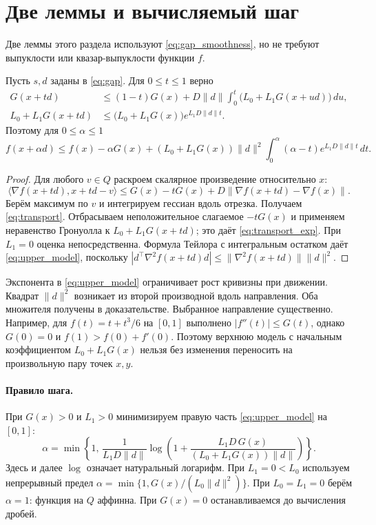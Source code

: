 \section{Две леммы и вычисляемый шаг}
Две леммы этого раздела используют \eqref{eq:gap_smoothness},
но не требуют выпуклости или квазар-выпуклости функции $f$.

\begin{lemma}\label{lem:transport}
Пусть $s,d$ заданы в \eqref{eq:gap}. Для $0\le t\le1$ верно
\begin{align}
 G(x+td)&\le(1-t)G(x)
    +D\|d\|\int_0^t\bigl(L_0+L_1G(x+ud)\bigr)\,du,
       \label{eq:transport}\\
 L_0+L_1G(x+td)&\le
      \bigl(L_0+L_1G(x)\bigr)e^{L_1D\|d\|t}.
       \label{eq:transport_exp}
\end{align}
Поэтому для $0\le\alpha\le1$
\begin{equation}\label{eq:upper_model}
 f(x+\alpha d)\le f(x)-\alpha G(x)
 +(L_0+L_1G(x))\|d\|^2
       \int_0^\alpha(\alpha-t)e^{L_1D\|d\|t}\,dt.
\end{equation}
\end{lemma}
\begin{proof}
Для любого $v\in Q$ раскроем скалярное произведение относительно $x$:
\[
 \langle\nabla f(x+td),x+td-v\rangle
 \le G(x)-tG(x)
       +D\|\nabla f(x+td)-\nabla f(x)\|.
\]
Берём максимум по $v$ и интегрируем гессиан вдоль отрезка.
Получаем \eqref{eq:transport}. Отбрасываем неположительное
слагаемое $-tG(x)$ и применяем неравенство Гронуолла к
$L_0+L_1G(x+td)$; это даёт \eqref{eq:transport_exp}.
При $L_1=0$ оценка непосредственна.
Формула Тейлора с интегральным остатком даёт \eqref{eq:upper_model},
поскольку
$|d^\top\nabla^2f(x+td)d|\le\|\nabla^2f(x+td)\|\|d\|^2$.
\end{proof}

Экспонента в \eqref{eq:upper_model} ограничивает рост кривизны
при движении. Квадрат $\|d\|^2$ возникает из второй производной
вдоль направления. Оба множителя получены в доказательстве.
Выбранное направление существенно. Например, для
$f(t)=t+t^3/6$ на $[0,1]$ выполнено $|f''(t)|\le G(t)$,
однако $G(0)=0$ и $f(1)>f(0)+f'(0)$.
Поэтому верхнюю модель с начальным коэффициентом $L_0+L_1G(x)$
нельзя без изменения переносить на произвольную пару точек $x,y$.

\paragraph{Правило шага.}
При $G(x)>0$ и $L_1>0$ минимизируем правую часть
\eqref{eq:upper_model} на $[0,1]$:
\begin{equation}\label{eq:log_step}
 \boxed{\displaystyle
 \alpha=\min\left\{1,\,
 \frac{1}{L_1D\|d\|}
 \log\left(1+
 \frac{L_1D\,G(x)}
 {(L_0+L_1G(x))\|d\|}\right)\right\}.}
\end{equation}
Здесь и далее $\log$ означает натуральный логарифм.
При $L_1=0<L_0$ используем непрерывный предел
$\alpha=\min\{1,G(x)/(L_0\|d\|^2)\}$.
При $L_0=L_1=0$ берём $\alpha=1$: функция на $Q$ аффинна.
При $G(x)=0$ останавливаемся до вычисления дробей.

